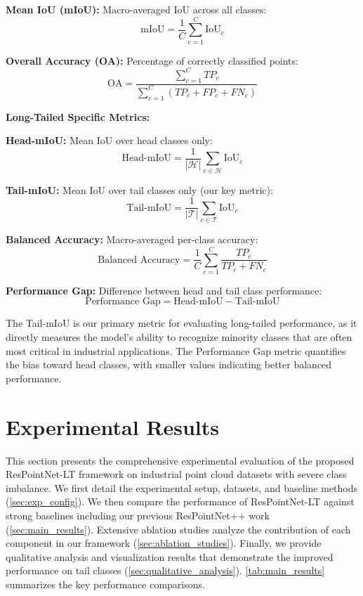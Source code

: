 \documentclass[preprint,12pt]{elsarticle}
\begin{document}
\textbf{Mean IoU (mIoU):} Macro-averaged IoU across all classes:
\begin{equation}
\label{eq:mIoU}
\text{mIoU} = \frac{1}{C}\sum_{c=1}^{C} \text{IoU}_c
\end{equation}

\textbf{Overall Accuracy (OA):} Percentage of correctly classified points:
\begin{equation}
\label{eq:accuracy}
\text{OA} = \frac{\sum_{c=1}^{C} TP_c}{\sum_{c=1}^{C} (TP_c + FP_c + FN_c)}
\end{equation}

\textbf{Long-Tailed Specific Metrics:}

\textbf{Head-mIoU:} Mean IoU over head classes only:
\begin{equation}
\text{Head-mIoU} = \frac{1}{|\mathcal{H}|}\sum_{c \in \mathcal{H}} \text{IoU}_c
\end{equation}

\textbf{Tail-mIoU:} Mean IoU over tail classes only (our key metric):
\begin{equation}
\text{Tail-mIoU} = \frac{1}{|\mathcal{T}|}\sum_{c \in \mathcal{T}} \text{IoU}_c
\end{equation}

\textbf{Balanced Accuracy:} Macro-averaged per-class accuracy:
\begin{equation}
\text{Balanced Accuracy} = \frac{1}{C}\sum_{c=1}^{C} \frac{TP_c}{TP_c + FN_c}
\end{equation}

\textbf{Performance Gap:} Difference between head and tail class performance:
\begin{equation}
\text{Performance Gap} = \text{Head-mIoU} - \text{Tail-mIoU}
\end{equation}

The Tail-mIoU is our primary metric for evaluating long-tailed performance, as it directly measures the model's ability to recognize minority classes that are often most critical in industrial applications. The Performance Gap metric quantifies the bias toward head classes, with smaller values indicating better balanced performance.

\section{Experimental Results}
\label{sec:results}

This section presents the comprehensive experimental evaluation of the proposed ResPointNet-LT framework on industrial point cloud datasets with severe class imbalance. We first detail the experimental setup, datasets, and baseline methods (\autoref{sec:exp_config}). We then compare the performance of ResPointNet-LT against strong baselines including our previous ResPointNet++ work (\autoref{sec:main_results}). Extensive ablation studies analyze the contribution of each component in our framework (\autoref{sec:ablation_studies}). Finally, we provide qualitative analysis and visualization results that demonstrate the improved performance on tail classes (\autoref{sec:qualitative_analysis}). \autoref{tab:main_results} summarizes the key performance comparisons.
\end{document}
